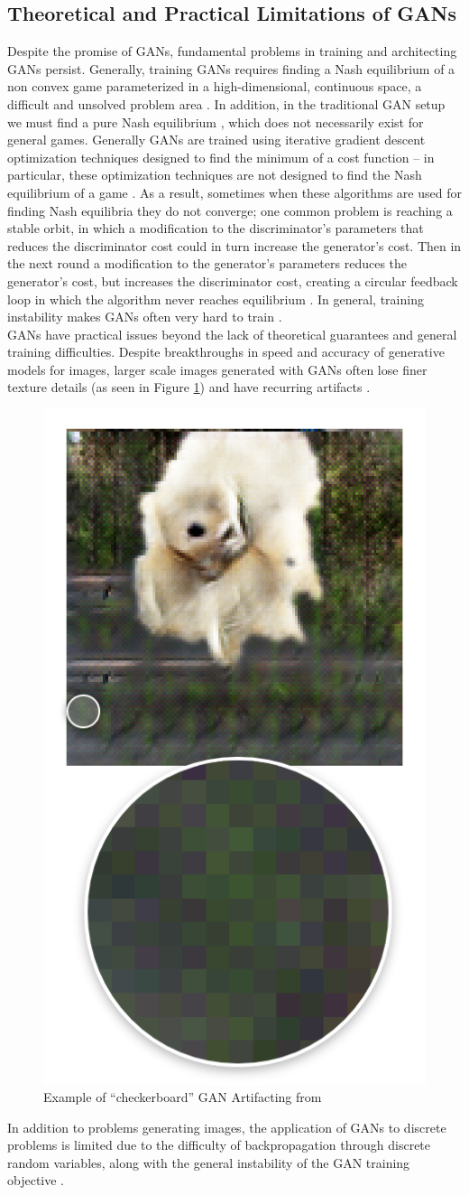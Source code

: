 \documentclass{article}
\begin{document}
\subsection{Theoretical and Practical Limitations of GANs}
Despite the promise of GANs, fundamental problems in training and architecting GANs persist. Generally, training GANs requires finding a Nash equilibrium of a non convex game parameterized in a high-dimensional, continuous space, a difficult and unsolved problem area \citep{Salimans2016}. In addition, in the traditional GAN setup we must find a pure Nash equilibrium \citep{Arora17}, which does not necessarily exist for general games. Generally GANs are trained using iterative gradient descent optimization techniques designed to find the minimum of a cost function – in particular, these optimization techniques are not designed to find the Nash equilibrium of a game \citep{Salimans2016}. As a result, sometimes when these algorithms are used for finding Nash equilibria they do not converge; one common problem is reaching a stable orbit, in which a modification to the discriminator's parameters that reduces the discriminator cost could in turn increase the generator’s cost. Then in the next round a modification to the generator’s parameters reduces the generator’s cost, but increases the discriminator cost, creating a circular feedback loop in which the algorithm never reaches equilibrium \citep{Salimans2016}. In general, training instability makes GANs often very hard to train \citep{DBLP:journals/corr/GulrajaniAADC17}.
\\
GANs have practical issues beyond the lack of theoretical guarantees and general training difficulties. Despite breakthroughs in speed and accuracy of generative models for images, larger scale images generated with GANs often lose finer texture details (as seen in Figure \ref{artifacting}) and have recurring artifacts \citep{DBLP:journals/corr/LedigTHCATTWS16} \citep{Salimans2016} \citep{DBLP:journals/corr/ShrivastavaPTSW16}.
\begin{figure}[H]
\centering
\includegraphics[width=.25\linewidth]{figures/artifacting_example.png}
\caption{Example of ``checkerboard'' GAN Artifacting from \citet{Salimans2016}}
\label{artifacting}
\end{figure}
In addition to problems generating images, the application of GANs to discrete problems is limited due to the difficulty of backpropagation through discrete random variables, along with the general instability of the GAN training objective \citep{Che+al-2017-augmented}. 
\end{document}
